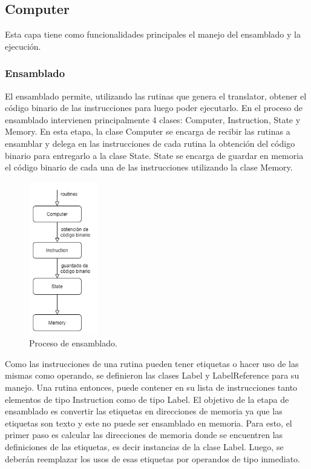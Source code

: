 \subsection{Computer}

Esta capa tiene como funcionalidades principales el manejo del ensamblado y la ejecución. 

\subsubsection*{Ensamblado}
El ensamblado permite, utilizando las rutinas que genera el translator, obtener el código binario de las instrucciones para luego poder ejecutarlo. 
En el proceso de ensamblado intervienen principalmente 4 clases: Computer, Instruction, State y Memory. En esta etapa, la clase Computer se encarga 
de recibir las rutinas a ensamblar y delega en las instrucciones de cada rutina la obtención del código binario para entregarlo a la clase State.
State se encarga de guardar en memoria el código binario de cada una de las instrucciones utilizando la clase Memory.

\begin{figure}[H]
  \centering
  \includegraphics[width=3cm]{figuras/ensamblado.png}
  \caption{Proceso de ensamblado.}
\end{figure}

Como las instrucciones de una rutina pueden tener etiquetas o hacer uso de las mismas como operando, se definieron las clases Label y LabelReference 
para su manejo. Una rutina entonces, puede contener en su lista de instrucciones tanto elementos de tipo Instruction como de tipo Label.
El objetivo de la etapa de ensamblado es convertir las etiquetas en direcciones de memoria ya que las etiquetas son texto y este no puede ser
ensamblado en memoria. Para esto, el primer paso es calcular las direcciones de memoria donde se encuentren las definiciones de las etiquetas, es decir 
instancias de la clase Label. Luego, se deberán reemplazar los usos de esas etiquetas por operandos de tipo inmediato.

